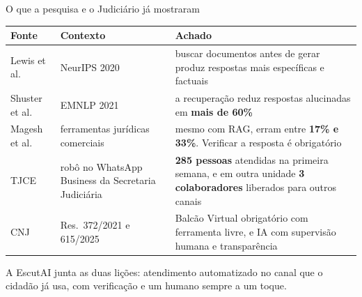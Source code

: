 \documentclass[aspectratio=169,10pt]{beamer}
\begin{document}
\begin{frame}{O que a pesquisa e o Judiciário já mostraram}
  \scriptsize
  \renewcommand{\arraystretch}{1.25}
  \begin{tabularx}{\linewidth}{@{}>{\raggedright\arraybackslash}p{3.0cm} >{\raggedright\arraybackslash}p{3.3cm} X@{}}
    \toprule
    \textbf{Fonte} & \textbf{Contexto} & \textbf{Achado} \\
    \midrule
    Lewis et al.\ \cite{lewis2020} & NeurIPS 2020 & buscar documentos antes de gerar produz respostas mais específicas e factuais \\
    Shuster et al.\ \cite{shuster2021} & EMNLP 2021 & a recuperação reduz respostas alucinadas em \textbf{mais de 60\%} \\
    Magesh et al.\ \cite{magesh2025} & ferramentas jurídicas comerciais & mesmo com RAG, erram entre \textbf{17\% e 33\%}. Verificar a resposta é obrigatório \\
    TJCE \cite{tjce} & robô no WhatsApp Business da Secretaria Judiciária & \textbf{285 pessoas} atendidas na primeira semana, e em outra unidade \textbf{3 colaboradores} liberados para outros canais \\
    CNJ \cite{cnj372,cnj615} & Res.\ 372/2021 e 615/2025 & Balcão Virtual obrigatório com ferramenta livre, e IA com supervisão humana e transparência \\
    \bottomrule
  \end{tabularx}
  \vfill
  {\small A EscutAI junta as duas lições: atendimento automatizado no canal que o cidadão já usa, com verificação e um humano sempre a um toque.}
\end{frame}
\end{document}
